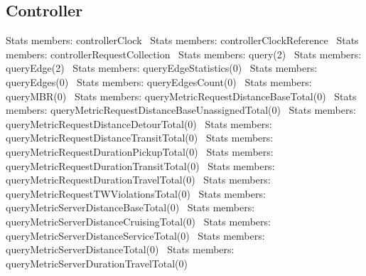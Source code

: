 \subsection{Controller}
\nwenddocs{}\plusendmoddef
\LA{}Stats members: controllerClock~{\nwtagstyle{}}\RA{}
\LA{}Stats members: controllerClockReference~{\nwtagstyle{}}\RA{}
\LA{}Stats members: controllerRequestCollection~{\nwtagstyle{}}\RA{}
\LA{}Stats members: query(2)~{\nwtagstyle{}}\RA{}
\LA{}Stats members: queryEdge(2)~{\nwtagstyle{}}\RA{}
\LA{}Stats members: queryEdgeStatistics(0)~{\nwtagstyle{}}\RA{}
\LA{}Stats members: queryEdges(0)~{\nwtagstyle{}}\RA{}
\LA{}Stats members: queryEdgesCount(0)~{\nwtagstyle{}}\RA{}
\LA{}Stats members: queryMBR(0)~{\nwtagstyle{}}\RA{}
\LA{}Stats members: queryMetricRequestDistanceBaseTotal(0)~{\nwtagstyle{}}\RA{}
\LA{}Stats members: queryMetricRequestDistanceBaseUnassignedTotal(0)~{\nwtagstyle{}}\RA{}
\LA{}Stats members: queryMetricRequestDistanceDetourTotal(0)~{\nwtagstyle{}}\RA{}
\LA{}Stats members: queryMetricRequestDistanceTransitTotal(0)~{\nwtagstyle{}}\RA{}
\LA{}Stats members: queryMetricRequestDurationPickupTotal(0)~{\nwtagstyle{}}\RA{}
\LA{}Stats members: queryMetricRequestDurationTransitTotal(0)~{\nwtagstyle{}}\RA{}
\LA{}Stats members: queryMetricRequestDurationTravelTotal(0)~{\nwtagstyle{}}\RA{}
\LA{}Stats members: queryMetricRequestTWViolationsTotal(0)~{\nwtagstyle{}}\RA{}
\LA{}Stats members: queryMetricServerDistanceBaseTotal(0)~{\nwtagstyle{}}\RA{}
\LA{}Stats members: queryMetricServerDistanceCruisingTotal(0)~{\nwtagstyle{}}\RA{}
\LA{}Stats members: queryMetricServerDistanceServiceTotal(0)~{\nwtagstyle{}}\RA{}
\LA{}Stats members: queryMetricServerDistanceTotal(0)~{\nwtagstyle{}}\RA{}
\LA{}Stats members: queryMetricServerDurationTravelTotal(0)~{\nwtagstyle{}}\RA{}
